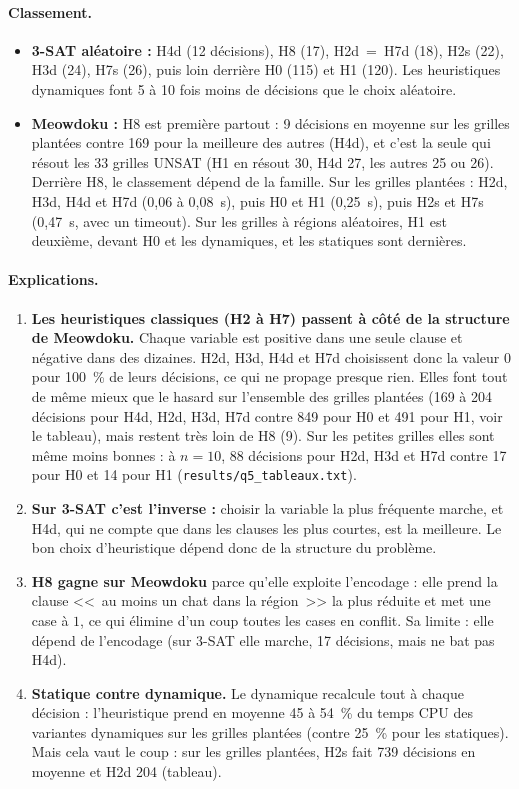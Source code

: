 \documentclass[11pt,a4paper]{article}
\begin{document}
\paragraph{Classement.}
\begin{itemize}
  \item \textbf{3-SAT aléatoire :} H4d (12 décisions), H8 (17), H2d~=~H7d (18), H2s (22), H3d (24), H7s (26), puis loin derrière H0 (115) et H1 (120). Les heuristiques dynamiques font 5 à 10 fois moins de décisions que le choix aléatoire.
  \item \textbf{Meowdoku :} H8 est première partout : 9 décisions en moyenne sur les grilles plantées contre 169 pour la meilleure des autres (H4d), et c'est la seule qui résout les 33 grilles UNSAT (H1 en résout 30, H4d 27, les autres 25 ou 26). Derrière H8, le classement dépend de la famille. Sur les grilles plantées : H2d, H3d, H4d et H7d (0,06 à 0,08~s), puis H0 et H1 (0,25~s), puis H2s et H7s (0,47~s, avec un timeout). Sur les grilles à régions aléatoires, H1 est deuxième, devant H0 et les dynamiques, et les statiques sont dernières.
\end{itemize}

\paragraph{Explications.}
\begin{enumerate}
  \item \textbf{Les heuristiques classiques (H2 à H7) passent à côté de la structure de Meowdoku.} Chaque variable est positive dans une seule clause et négative dans des dizaines. H2d, H3d, H4d et H7d choisissent donc la valeur $0$ pour 100~\% de leurs décisions, ce qui ne propage presque rien. Elles font tout de même mieux que le hasard sur l'ensemble des grilles plantées (169 à 204 décisions pour H4d, H2d, H3d, H7d contre 849 pour H0 et 491 pour H1, voir le tableau), mais restent très loin de H8 (9). Sur les petites grilles elles sont même moins bonnes : à $n=10$, 88 décisions pour H2d, H3d et H7d contre 17 pour H0 et 14 pour H1 (\texttt{results/q5\_tableaux.txt}).
  \item \textbf{Sur 3-SAT c'est l'inverse :} choisir la variable la plus fréquente marche, et H4d, qui ne compte que dans les clauses les plus courtes, est la meilleure. Le bon choix d'heuristique dépend donc de la structure du problème.
  \item \textbf{H8 gagne sur Meowdoku} parce qu'elle exploite l'encodage : elle prend la clause <<~au moins un chat dans la région~>> la plus réduite et met une case à $1$, ce qui élimine d'un coup toutes les cases en conflit. Sa limite : elle dépend de l'encodage (sur 3-SAT elle marche, 17 décisions, mais ne bat pas H4d).
  \item \textbf{Statique contre dynamique.} Le dynamique recalcule tout à chaque décision : l'heuristique prend en moyenne 45 à 54~\% du temps CPU des variantes dynamiques sur les grilles plantées (contre 25~\% pour les statiques). Mais cela vaut le coup : sur les grilles plantées, H2s fait 739 décisions en moyenne et H2d 204 (tableau).
\end{enumerate}
\end{document}
